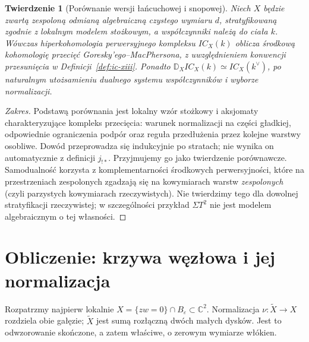 \documentclass[11pt,a4paper,oneside]{report}
\newcommand{\C}{\mathbb{C}}
\theoremstyle{plain}
\newtheorem{twierdzenie}{Twierdzenie}[section]
\theoremstyle{definition}
\theoremstyle{remark}
\begin{document}
\begin{twierdzenie}[Porównanie wersji łańcuchowej i snopowej]
\label{thm:ic-comparison-xiii}
Niech $X$ będzie zwartą zespoloną odmianą
algebraiczną czystego wymiaru $d$,
stratyfikowaną zgodnie z lokalnym modelem stożkowym,
a współczynniki należą do ciała $k$.
Wówczas hiperkohomologia perwersyjnego kompleksu
$IC_X(k)$ oblicza środkową kohomologię przecięć
Goresky'ego--MacPhersona, z uwzględnieniem
konwencji przesunięcia w Definicji~\ref{def:ic-xiii}.
Ponadto $\mathbb D_XIC_X(k)\simeq IC_X(k^\vee)$,
po naturalnym utożsamieniu dualnego systemu
współczynników i wyborze normalizacji.
\end{twierdzenie}
\begin{proof}[Zakres]
Podstawą porównania jest lokalny wzór stożkowy
i aksjomaty charakteryzujące kompleks przecięcia:
warunek normalizacji na części gładkiej,
odpowiednie ograniczenia podpór oraz reguła
przedłużenia przez kolejne warstwy osobliwe.
Dowód przeprowadza się indukcyjnie po stratach;
nie wynika on automatycznie z definicji $j_{!*}$.
Przyjmujemy go jako twierdzenie porównawcze.
Samodualność korzysta z komplementarności
środkowych perwersyjności, które na przestrzeniach
zespolonych zgadzają się na kowymiarach warstw
\emph{zespolonych} (czyli parzystych kowymiarach
rzeczywistych). Nie twierdzimy tego dla dowolnej
stratyfikacji rzeczywistej; w szczególności
przykład $\Sigma T^2$ nie jest modelem
algebraicznym o tej własności.
\end{proof}

\section{Obliczenie: krzywa węzłowa i jej normalizacja}
\label{sec:nodal-perverse-xiii}
Rozpatrzmy najpierw lokalnie
$X=\{zw=0\}\cap B_\varepsilon\subset\C^2$.
Normalizacja $\nu:\widetilde X\to X$ rozdziela
obie gałęzie; $\widetilde X$ jest sumą rozłączną
dwóch małych dysków. Jest to odwzorowanie skończone,
a zatem właściwe, o zerowym wymiarze włókien.
\end{document}

